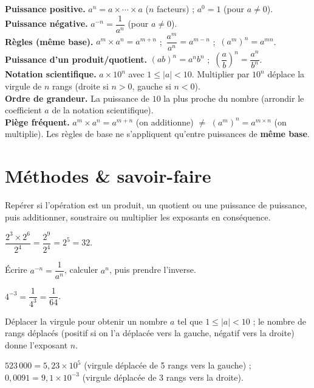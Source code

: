 \begin{synthese}
\textbf{Puissance positive.} $a^{n}=a\times\cdots\times a$ ($n$ facteurs) ; $a^{0}=1$ (pour
$a\ne0$).\\[4pt]
\textbf{Puissance négative.} $a^{-n}=\dfrac1{a^{n}}$ (pour $a\ne0$).\\[4pt]
\textbf{Règles (même base).} $a^{m}\times a^{n}=a^{m+n}$ ;\
$\dfrac{a^{m}}{a^{n}}=a^{m-n}$ ;\ $(a^{m})^{n}=a^{mn}$.\\[4pt]
\textbf{Puissance d'un produit/quotient.} $(ab)^{n}=a^{n}b^{n}$ ;\
$\left(\dfrac ab\right)^{n}=\dfrac{a^{n}}{b^{n}}$.\\[4pt]
\textbf{Notation scientifique.} $a\times10^{n}$ avec $1\le|a|<10$. Multiplier par $10^{n}$
déplace la virgule de $n$ rangs (droite si $n>0$, gauche si $n<0$).\\[4pt]
\textbf{Ordre de grandeur.} La puissance de $10$ la plus proche du nombre (arrondir le
coefficient $a$ de la notation scientifique).\\[4pt]
\textbf{Piège fréquent.} $a^{m}\times a^{n}=a^{m+n}$ (on additionne) $\ne$
$(a^{m})^{n}=a^{m\times n}$ (on multiplie). Les règles de base ne s'appliquent qu'entre
puissances de \textbf{même base}.
\end{synthese}

\section{Méthodes \& savoir-faire}

Repérer si l'opération est un produit, un quotient ou une puissance de puissance, puis
additionner, soustraire ou multiplier les exposants en conséquence.
\begin{exemple}
$\dfrac{2^{3}\times2^{6}}{2^{4}}=\dfrac{2^{9}}{2^{4}}=2^{5}=32$.
\end{exemple}

Écrire $a^{-n}=\dfrac1{a^{n}}$, calculer $a^{n}$, puis prendre l'inverse.
\begin{exemple}
$4^{-3}=\dfrac1{4^{3}}=\dfrac1{64}$.
\end{exemple}

Déplacer la virgule pour obtenir un nombre $a$ tel que $1\le|a|<10$ ; le nombre de rangs
déplacés (positif si on l'a déplacée vers la gauche, négatif vers la droite) donne
l'exposant $n$.
\begin{exemple}
$523\,000=5{,}23\times10^{5}$ (virgule déplacée de 5 rangs vers la gauche) ;
$0{,}0091=9{,}1\times10^{-3}$ (virgule déplacée de 3 rangs vers la droite).
\end{exemple}

